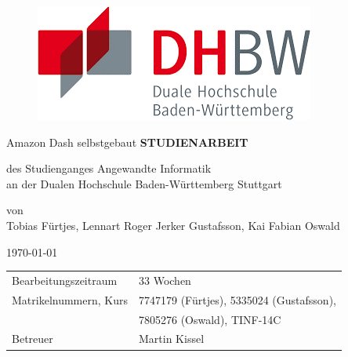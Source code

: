 \begin{figure}[!htb]
%
  \includegraphics[width=\linewidth]{DHBW-Logo.png}
  \label{fig:awesome_image3}
\endminipage
\end{figure}

\begin{center}
\vfill
{\Large Amazon Dash selbstgebaut}
\vfill
\textbf{STUDIENARBEIT}
\vfill

des Studienganges Angewandte Informatik\\
\vspace{12pt}
an der Dualen Hochschule Baden-Württemberg Stuttgart
\vfill

von\\
\vspace{12pt}
Tobias Fürtjes, Lennart Roger Jerker Gustafsson, Kai Fabian Oswald
\vfill

\today
\vfill

\begin{tabular}{ll}
Bearbeitungszeitraum & 33 Wochen \\
Matrikelnummern, Kurs & 7747179 (Fürtjes), 5335024 (Gustafsson), \\

& 7805276 (Oswald), TINF-14C \\
Betreuer & Martin Kissel \\
\end{tabular}

\end{center}